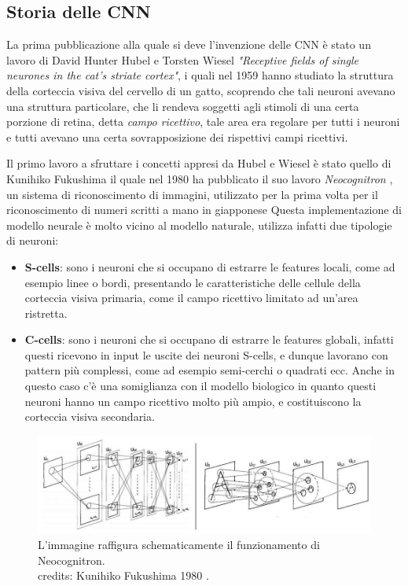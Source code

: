 \subsection{Storia delle CNN}

La prima pubblicazione alla quale si deve l'invenzione delle CNN è stato un lavoro di David Hunter Hubel e Torsten Wiesel 
\textit{"Receptive fields of single neurones in the cat's striate cortex"}, i quali nel 1959 hanno studiato la struttura della 
corteccia visiva del cervello di un gatto, scoprendo che tali neuroni avevano una struttura particolare, che li rendeva 
soggetti agli stimoli di una certa porzione di retina, detta \textit{campo ricettivo}, tale area era regolare per tutti i neuroni
e tutti avevano una certa sovrapposizione dei rispettivi campi ricettivi.


Il primo lavoro a sfruttare i concetti appresi da Hubel e Wiesel è stato quello di Kunihiko Fukushima il quale nel 1980
ha pubblicato il suo lavoro \textit{Neocognitron} \cite{Fukushima1980Neocognitron}, un sistema di riconoscimento di immagini, 
utilizzato per la prima volta per il riconoscimento di numeri scritti a mano in giapponese
Questa implementazione di modello neurale è molto vicino al modello naturale, utilizza infatti due tipologie di neuroni:
\begin{itemize}
    \item \textbf{S-cells}: sono i neuroni che si occupano di estrarre le features locali, come ad esempio linee o bordi,
        presentando le caratteristiche delle cellule della corteccia visiva primaria, come il campo ricettivo limitato
        ad un'area ristretta.
    \item \textbf{C-cells}: sono i neuroni che si occupano di estrarre le features globali, infatti questi ricevono in input le uscite
        dei neuroni S-cells, e dunque lavorano con pattern più complessi, come ad esempio semi-cerchi o quadrati ecc. Anche in questo caso
        c'è una somiglianza con il modello biologico in quanto questi neuroni hanno un campo ricettivo molto più ampio, e costituiscono
        la corteccia visiva secondaria.
\end{itemize}
    \begin{figure}[h]
        \centering
        \includegraphics[width=1.0\textwidth]{imgs/neocognitron.jpg}
        \caption{L'immagine raffigura schematicamente il  funzionamento di Neocognitron.\\
        credits: Kunihiko Fukushima 1980 \cite{Fukushima1980Neocognitron}.}
        \label{fig:neocognitron} 
    \end{figure}

